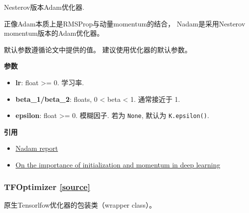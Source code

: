 Nesterov版本Adam优化器.

正像Adam本质上是RMSProp与动量momentum的结合， Nadam是采用Nesterov
momentum版本的Adam优化器。

默认参数遵循论文中提供的值。 建议使用优化器的默认参数。

\textbf{参数}

\begin{itemize}
\tightlist
\item
  \textbf{lr}: float \textgreater{}= 0. 学习率.
\item
  \textbf{beta\_1/beta\_2}: floats, 0 \textless{} beta \textless{} 1.
  通常接近于 1.
\item
  \textbf{epsilon}: float \textgreater{}= 0. 模糊因子. 若为
  \texttt{None}, 默认为 \texttt{K.epsilon()}.
\end{itemize}

\textbf{引用}

\begin{itemize}
\tightlist
\item
  \href{http://cs229.stanford.edu/proj2015/054_report.pdf}{Nadam report}
\item
  \href{http://www.cs.toronto.edu/~fritz/absps/momentum.pdf}{On the
  importance of initialization and momentum in deep learning}
\end{itemize}



\subsubsection{TFOptimizer  {\href{https://github.com/keras-team/keras/blob/master/keras/optimizers.py\#L649}{{[}source{]}}}}

\begin{Shaded}
\begin{Highlighting}[]
\end{Highlighting}
\end{Shaded}

原生Tensorlfow优化器的包装类（wrapper class）。
\newpage
